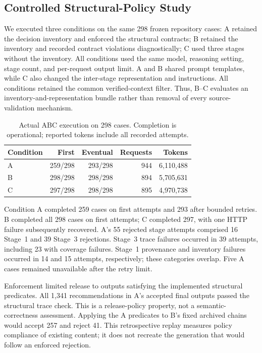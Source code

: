 \subsection{Controlled Structural-Policy Study}
\label{sec:controlled-abc-actual}
We executed three conditions on the same 298 frozen repository cases:
A retained the decision inventory and enforced the structural contracts;
B retained the inventory and recorded contract violations diagnostically;
C used three stages without the inventory. All conditions used the same
model, reasoning setting, stage count, and per-request output limit.
A and B shared prompt templates, while C also changed the inter-stage
representation and instructions. All conditions retained the common
verified-context filter. Thus, B--C evaluates an inventory-and-representation
bundle rather than removal of every source-validation mechanism.

\begin{table}[t]
\centering
\caption{Actual ABC execution on 298 cases. Completion is operational;
reported tokens include all recorded attempts.}
\label{tab:abc-actual-execution}
\begin{tabular}{lrrrr}
\hline
Condition & First & Eventual & Requests & Tokens \\
\hline
A & 259/298 & 293/298 & 944 & 6,110,488 \\
B & 298/298 & 298/298 & 894 & 5,705,631 \\
C & 297/298 & 298/298 & 895 & 4,970,738 \\
\hline
\end{tabular}
\end{table}

Condition A completed 259 cases on first attempts and 293 after bounded
retries. B completed all 298 cases on first attempts; C completed 297,
with one HTTP failure subsequently recovered. A's 55 rejected stage attempts
comprised 16 Stage~1 and 39 Stage~3 rejections. Stage~3 trace failures occurred
in 39 attempts, including 23 with coverage failures. Stage~1 provenance and
inventory failures occurred in 14 and 15 attempts, respectively; these
categories overlap. Five A cases remained unavailable after the retry limit.

Enforcement limited release to outputs satisfying the implemented
structural predicates. All 1,341 recommendations in A's accepted final
outputs passed the structural trace check. This is a release-policy property,
not a semantic-correctness assessment. Applying the A predicates to B's
fixed archived chains would accept 257 and reject 41. This retrospective
replay measures policy compliance of existing content; it does not recreate
the generation that would follow an enforced rejection.

